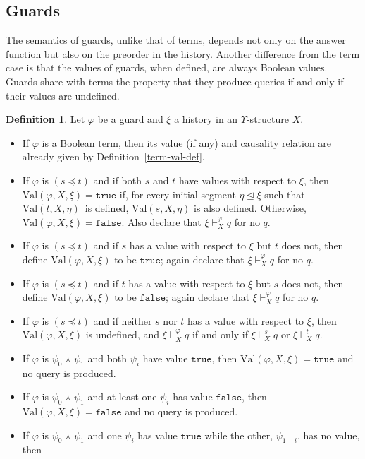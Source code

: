 \documentclass{LMCS}
\theoremstyle{definition}
\newtheorem{df}[thm]{Definition}
\newenvironment{ls}{\begin{itemize}}{\end{itemize}}
\newcommand{\U}{\Upsilon}
\newcommand{\initeq}{\unlhd}
\newcommand{\kand}{\curlywedge}
\newcommand{\ttt}[1]{\ensuremath{\mathtt {#1}}}
\newcommand{\val}[3]{\ensuremath{\text{Val}(#1,#2,#3)}}
\renewcommand{\phi}{\varphi}
\begin{document}
\subsection{Guards}

The semantics of guards, unlike that of terms, depends not only on the
answer function but also on the preorder in the history.  Another
difference from the term case is that the values of guards, when
defined, are always Boolean values.  Guards share with terms the
property that they produce queries if and only if their values are
undefined.

\begin{df}   \label{guard-sem-def}
Let $\phi$ be a guard and $\xi$ a history in an $\U$-structure
$X$.
\begin{ls}
  \item If $\phi$ is a Boolean term, then its value (if any) and
  causality relation are already given by
  Definition~\ref{term-val-def}.
  \item If $\phi$ is $(s\preceq t)$ and if both $s$ and $t$ have values
  with respect to $\xi$, then $\val\phi X\xi=\ttt{true}$ if, for every
  initial segment $\eta\initeq\xi$ such that \val tX\eta\ is defined,
  $\val sX\eta$ is also defined.  Otherwise, $\val\phi
  X\xi=\ttt{false}$.  Also declare that $\xi\vdash^\phi_Xq$ for no
  $q$.
  \item If $\phi$ is $(s\preceq t)$ and if $s$ has a value with respect
  to $\xi$ but $t$ does not, then define $\val\phi X\xi$ to be
  \ttt{true}; again declare that $\xi\vdash^\phi_Xq$ for no $q$.
  \item If $\phi$ is $(s\preceq t)$ and if $t$ has a value with respect
  to $\xi$ but $s$ does not, then define $\val\phi X\xi$ to be
  \ttt{false}; again declare that $\xi\vdash^\phi_Xq$ for no $q$.
  \item If $\phi$ is $(s\preceq t)$ and if neither $s$ nor $t$ has a
  value with respect to $\xi$, then $\val\phi X\xi$ is undefined,
  and $\xi\vdash^\phi_Xq$ if and only if $\xi\vdash^s_Xq$ or
  $\xi\vdash^t_Xq$.
  \item If $\phi$ is $\psi_0\kand\psi_1$ and both $\psi_i$ have value
  \ttt{true}, then $\val\phi X\xi=\ttt{true}$ and no query is
  produced.
  \item If $\phi$ is $\psi_0\kand\psi_1$ and at least one $\psi_i$ has
  value \ttt{false}, then $\val\phi X\xi=\ttt{false}$ and no query
  is produced.
  \item If $\phi$ is $\psi_0\kand\psi_1$ and one $\psi_i$ has value
  \ttt{true} while the other, $\psi_{1-i}$, has no value, then

\end{ls}
\end{df}
\end{document}
